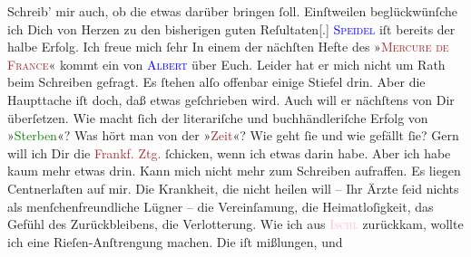                Schreib’ mir auch, ob die \label{K_L02630-3v}\label{K_L02630-3h} etwas darüber bringen ſoll.
               Einſtweilen beglückwünſche ich Dich von Herzen zu den bisherigen guten
                  Reſultaten{[}.{]}{ }\textsc{\textcolor{blue}{Speidel}{}\ledrightnote{\textcolor{blue}{Ludwig Speidel}}} iſt bereits der halbe Erfolg. Ich freue mich ſehr{\dotsfive}\pend
           \pstart
           In einem der nächſten Hefte des »\textsc{\textcolor{brown}{Mercure de France}{}\ledrightnote{\textcolor{brown}{Mercure de France}}}« kommt ein \label{K_L02630-12v}\label{K_L02630-12h} von \textsc{\textcolor{blue}{Albert}{}\ledrightnote{\textcolor{blue}{Henri Albert}}} über Euch. Leider hat er mich nicht um Rath {\pb}beim Schreiben gefragt. Es ſtehen alſo offenbar einige Stiefel drin. Aber die
               Haupttache iſt doch, daß etwas geſchrieben wird. Auch will er nächſtens \label{K_L02630-4v}\label{K_L02630-4h} von Dir überſetzen. Wie macht ſich der
               literariſche und buchhändleriſche Erfolg von »\textcolor{green}{Sterben}{}\ledrightnote{\textcolor{green}{Sterben. Novelle}}«?\pend
           \pstart
           Was hört man von der »\textcolor{brown}{Zeit}{}\ledrightnote{\textcolor{brown}{Die Zeit. Wiener Wochenschrift}}«? Wie geht ſie und wie
               gefällt ſie?\pend
           \pstart
           Gern will ich Dir die \textcolor{brown}{Frankf. Ztg.}{}\ledrightnote{\textcolor{brown}{Frankfurter Zeitung}} ſchicken, wenn
               ich etwas darin habe. Aber ich habe kaum mehr etwas drin. Kann {\pb}mich nicht mehr zum Schreiben aufraffen. Es liegen
               Centnerlaſten auf mir. Die Krankheit, die nicht heilen will – Ihr Ärzte ſeid nichts
               als menſchenfreundliche Lügner – die Vereinſamung, die Heimatloſigkeit, das Gefühl
               des Zurückbleibens, die Verlotterung. Wie ich aus \textsc{\textcolor{pink}{Ischl}{}\ledrightnote{\textcolor{pink}{Bad Ischl}}} zurückkam, wollte ich eine Rieſen-Anſtrengung machen. Die iſt mißlungen, und
